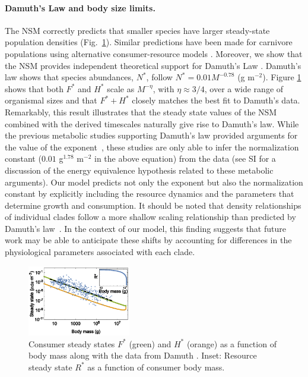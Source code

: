 \documentclass[twocolumn,preprintnumbers,amsmath,amssymb,superscriptaddress]{revtex4}
\begin{document}
\noindent \paragraph*{{\bf Damuth's Law and body size limits.}} The NSM
correctly predicts that smaller species have larger steady-state population
densities (Fig.~\ref{fig:mass}).  Similar predictions have been made for
carnivore populations using alternative consumer-resource models
\citep{DeLong:2012kw}.  Moreover, we show that the NSM provides independent
theoretical support for Damuth's Law
\citep{Damuth:1987kr,allen2002,enquist1998,pedersen2017shallow}.  Damuth's
law shows that species abundances, $N^{*}$, follow $N^*=0.01
M^{-0.78}$ (g m$^{-2}$). Figure \ref{fig:mass} shows that both $F^{*}$ and $H^{*}$ scale
as $M^{-\eta}$, with $\eta\approx 3/4$,  over a wide range of organismal sizes and that $F^{*}+H^{*}$
closely matches the best fit to Damuth's data.  Remarkably, this result
illustrates that the steady state values of the NSM combined with the derived
timescales naturally give rise to Damuth's law. While the previous metabolic
studies supporting Damuth's law provided arguments for the value of the
exponent~\citep{allen2002}, these studies are only able to infer the
normalization constant ($0.01$ g$^{1.78}$ m$^{-2}$ in the above equation) from the data (see SI for a discussion of the energy
equivalence hypothesis related to these metabolic arguments). Our model
predicts not only the exponent but also the normalization constant by
explicitly including the resource dynamics and the parameters that determine
growth and consumption. It should be noted that density relationships of
individual clades follow a more shallow scaling relationship than predicted
by Damuth's law~\cite{pedersen2017shallow}.  In the context of our model,
this finding suggests that future work may be able to anticipate these shifts
by accounting for differences in the physiological parameters associated with
each clade.


\begin{figure}
\centering
\includegraphics[width=0.4\textwidth]{fig_FPAllometric2.eps}
\caption{\small{Consumer steady states $F^*$ (green) and $H^*$ (orange) as a function of
  body mass along with the data from Damuth \citep{Damuth:1987kr}. Inset: Resource steady state $R^*$ as a function of consumer body mass.}\label{fig:mass}}
\end{figure}
\end{document}
